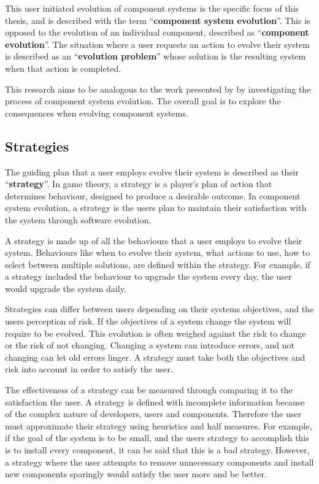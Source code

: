 This user initiated evolution of component systems is the specific focus of this thesis, and is described with the term ``\textbf{component system evolution}''.
This is opposed to the evolution of an individual component, described as ``\textbf{component evolution}''.
The situation where a user requests an action to evolve their system is described as an ``\textbf{evolution problem}'' whose solution is the resulting system when that action is completed.

This research aims to be analogous to the work presented by \cite{lehman1980} by investigating the process of component system evolution.
The overall goal is to explore the consequences when evolving component systems.

\subsection{Strategies}
The guiding plan that a user employs evolve their system is described as their ``\textbf{strategy}''.
In game theory, a strategy is a player's plan of action that determines behaviour, designed to produce a desirable outcome.
In component system evolution, a strategy is the users plan to maintain their satisfaction with the system through software evolution.

A strategy is made up of all the behaviours that a user employs to evolve their system.
Behaviours like when to evolve their system, what actions to use, how to select between multiple solutions, are defined within the strategy.
For example, if a strategy included the behaviour to upgrade the system every day, the user would upgrade the system daily. 

Strategies can differ between users depending on their systems objectives, and the users perception of risk.
If the objectives of a system change the system will require to be evolved.
This evolution is often weighed against the risk to change or the risk of not changing.
Changing a system can introduce errors, and not changing can let old errors linger. 
A strategy must take both the objectives and risk into account in order to satisfy the user.

The effectiveness of a strategy can be measured through comparing it to the satisfaction the user.
A strategy is defined with incomplete information because of the complex nature of developers, users and components.
Therefore the user must approximate their strategy using heuristics and half measures.
For example, if the goal of the system is to be small, and the users strategy to accomplish this is to install every component, it can be said that this is a bad strategy. 
However, a strategy where the user attempts to remove unnecessary components and install new components sparingly would satisfy the user more and be better.

